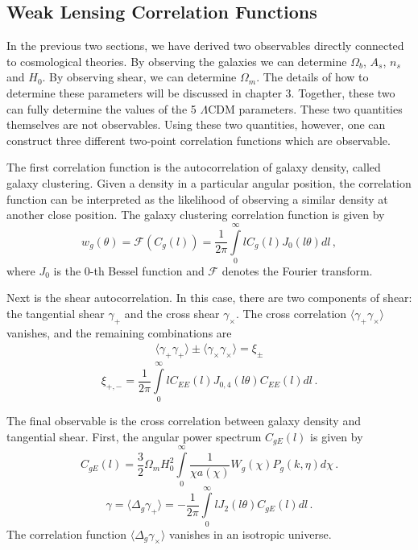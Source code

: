 \subsection{Weak Lensing Correlation Functions}
In the previous two sections, we have derived two observables directly connected to cosmological theories. By observing the galaxies we can determine $\Omega_b$, $A_s$, $n_s$ and $H_0$. By observing shear, we can determine $\Omega_m$. The details of how to determine these parameters will be discussed in chapter 3. Together, these two can fully determine the values of the 5 $\Lambda$CDM parameters. These two quantities themselves are not observables. Using these two quantities, however, one can construct three different two-point correlation functions which are observable.

The first correlation function is the autocorrelation of galaxy density, called galaxy clustering. Given a density in a particular angular position, the correlation function can be interpreted as the likelihood of observing a similar density at another close position. The galaxy clustering correlation function is given by
\begin{equation}
	w_g(\theta) = \mathcal{F}(C_g(l)) = \frac{1}{2\pi}\int\limits_0^\infty l C_g(l) J_0(l\theta)dl\,,
\end{equation}
where $J_0$ is the 0-th Bessel function and $\mathcal{F}$ denotes the Fourier transform.

Next is the shear autocorrelation. In this case, there are two components of shear: the tangential shear $\gamma_+$ and the cross shear $\gamma_\times$. The cross correlation $\langle \gamma_+ \gamma_\times \rangle$ vanishes, and the remaining combinations are
\begin{equation}
	\begin{split}
		\langle \gamma_+\gamma_+ \rangle \pm \langle \gamma_\times \gamma_\times \rangle = \xi_\pm
	\end{split}
\end{equation}
\begin{equation}
	\xi_{+,-} = \frac{1}{2\pi}\int\limits_0^\infty l C_{EE}(l) J_{0,4}(l\theta)C_{EE}(l)dl\,.
\end{equation}

The final observable is the cross correlation between galaxy density and tangential shear. First, the angular power spectrum $C_{gE}(l)$ is given by
\begin{equation}
	C_{gE}(l) = \frac{3}{2}\Omega_mH_0^2 \int\limits_0^\infty \frac{1}{\chi a(\chi)}W_g(\chi)P_g(k,\eta) d\chi\,.
\end{equation}
\begin{equation}
	\gamma = \langle \Delta_g\gamma_+\rangle = -\frac{1}{2\pi}\int\limits_0^\infty l J_2(l\theta)C_{gE}(l)dl\,.
\end{equation}
The correlation function $\langle \Delta_g\gamma_\times\rangle$ vanishes in an isotropic universe.

